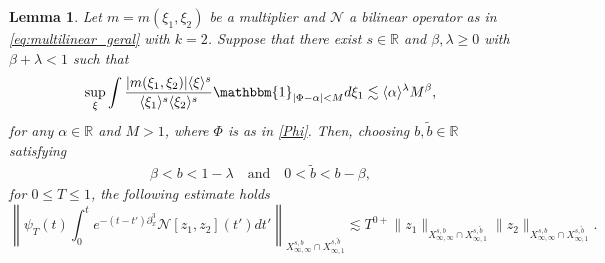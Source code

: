 \documentclass[%
11pt,  reqno]{amsart}
\newcommand{\jap}[1]{\langle #1 \rangle}
\newcommand{\5}{\textup{V}}
\newcommand{\les}{\lesssim}
\newcommand{\wt}{\widetilde}
\newtheorem{lemma}[theorem]{Lemma}
\theoremstyle{remark}
\newcommand{\R}{\mathbb{R}}
\numberwithin{equation}{section}
\numberwithin{theorem}{section}
\newcommand{\Ncal}{\mathcal{N}}
\begin{document}
		
		\begin{lemma}\label{lem:reduction_fre_k2}
			Let $m= m(\xi_1,\xi_2)$ be a multiplier and $\Ncal$ a bilinear operator as in \eqref{eq:multilinear_geral} with $k=2$. 
Suppose that there exist $s\in\R$ and $\beta,\lambda\ge 0$ with $\beta+\lambda<1$ such that
			\begin{equation}\label{fre}
				\sup_{\xi} \int \frac{|m(\xi_1,\xi_2)|\jap{\xi}^s}{\jap{\xi_1}^s\jap{\xi_2}^s} \mathbbm{1}_{|\Phi-\alpha|<M} d\xi_1 \lesssim \jap{\alpha}^\lambda M^\beta, 
			\end{equation}
for any $\alpha\in \R$ and $M>1$,
where $\Phi$ is as in \eqref{Phi}.
Then, choosing $b,\wt b\in\R$ satisfying 
\begin{align}\label{freb}
 \beta<b<1-\lambda
\quad 
\text{and}
\quad 
 0<\wt{b}<b-\beta, 
\end{align}
  for $ 0 \le T \le 1$, the following estimate holds
\begin{equation}\label{eq:bilin_infty}
    \left\|\psi_T (t)\int_0^t e^{-(t-t')\partial_x^3}\Ncal[z_1,z_2](t')dt' \right\|_{X^{s,b}_{\infty, \infty} \cap X^{s,\tilde{b}}_{\infty,1}}  \les T^{0+}\|z_1\|_{X^{s,b}_{\infty, \infty} \cap X^{s,\tilde{b}}_{\infty,1}}\|z_2\|_{X^{s,b}_{\infty, \infty} \cap X^{s,\tilde{b}}_{\infty,1}}.
\end{equation}

            

		\end{lemma}
\end{document}
